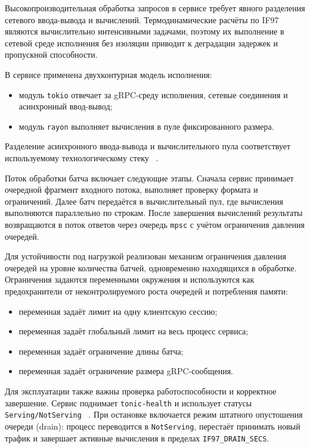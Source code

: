Высокопроизводительная обработка запросов в сервисе требует явного разделения сетевого ввода-вывода и вычислений.  
Термодинамические расчёты по IF97 являются вычислительно интенсивными задачами, поэтому их выполнение в сетевой среде исполнения без изоляции приводит к деградации задержек и пропускной способности.  

В сервисе применена двухконтурная модель исполнения:
\begin{itemize}
\item модуль \texttt{tokio} отвечает за gRPC-среду исполнения, сетевые соединения и асинхронный ввод-вывод;  
\item модуль \texttt{rayon} выполняет вычисления в пуле фиксированного размера.  
\end{itemize}
Разделение асинхронного ввода-вывода и вычислительного пула
соответствует используемому технологическому стеку
~\cite{tokio_spawn_blocking_docs,rayon_docs}.  

Поток обработки батча включает следующие этапы.  
Сначала сервис принимает очередной фрагмент входного потока, выполняет проверку формата и ограничений.  
Далее батч передаётся в вычислительный пул, где вычисления выполняются параллельно по строкам.  
После завершения вычислений результаты возвращаются в поток ответов
через очередь \texttt{mpsc} с учётом ограничения давления очередей.

Для устойчивости под нагрузкой реализован механизм ограничения давления очередей на уровне количества батчей, одновременно находящихся в обработке.  
Ограничения задаются переменными окружения и используются как предохранители от неконтролируемого роста очередей и потребления памяти:
\begin{itemize}
\item переменная  задаёт лимит на одну клиентскую сессию;  
\item переменная  задаёт глобальный лимит на весь процесс сервиса;  
\item переменная  задаёт ограничение длины батча;  
\item переменная  задаёт ограничение размера gRPC-сообщения.  
\end{itemize}

Для эксплуатации также важны проверка работоспособности и корректное завершение.  
Сервис поднимает \texttt{tonic-health} и использует статусы \texttt{Serving/NotServing}
~\cite{tonic_health_docs}.  
При остановке включается режим штатного опустошения очереди (drain):
процесс переводится в \texttt{NotServing},
перестаёт принимать новый трафик
и завершает активные вычисления в пределах \texttt{IF97\_DRAIN\_SECS}.  
